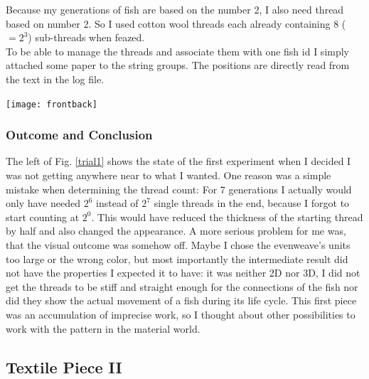 \documentclass{scrartcl}
\begin{document}
\begin{minipage}[t]{0.48\textwidth}
\end{minipage}
\hspace{0.5cm}
\begin{minipage}[t]{0.48\textwidth}
	Because my generations of fish are based on the number 2, I also need thread based on number 2. So I used cotton wool threads each already containing 8 ($=2^3$) sub-threads when feazed.\\
	To be able to manage the threads and associate them with one fish id I simply attached some paper to the string groups. The positions are directly read from the text in the log file.
\end{minipage}
\vspace{0.5cm}

\begin{minipage}[t]{\textwidth}
    \texttt{[image: frontback]}
	\label{trial1}
\end{minipage}
\vspace{0.5cm}

\subsubsection{Outcome and Conclusion}
The left of Fig. \ref{trial1} shows the state of the first experiment when I decided I was not getting anywhere near to what I wanted. One reason was a simple mistake when determining the thread count: For 7 generations I actually would only have needed $2^6$ instead of $2^7$ single threads in the end, because I forgot to start counting at $2^0$. This would have reduced the thickness of the starting thread by half and also changed the appearance. 
A more serious problem for me was, that the visual outcome was somehow off. Maybe I chose the evenweave's units too large or the wrong color, but most importantly the intermediate result did not have the properties I expected it to have: it was neither 2D nor 3D, I did not get the threads to be stiff and straight enough for the connections of the fish nor did they show the actual movement of a fish during its life cycle.
This first piece was an accumulation of imprecise work, so I thought about other possibilities to work with the pattern in the material world.

\subsection{Textile Piece II}
\end{document}
